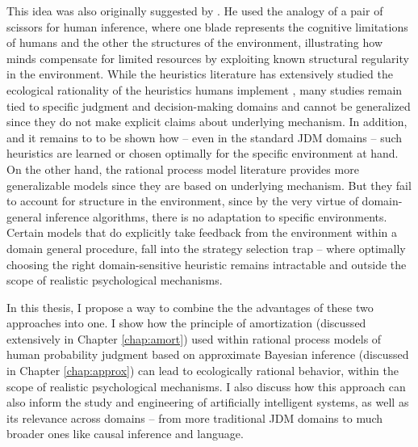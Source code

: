 This idea was also originally suggested by \citet{simon1955behavioral}. He used the analogy of a pair of scissors for human inference, where one blade represents the cognitive limitations of humans and the other the structures of the environment, illustrating how minds compensate for limited resources by exploiting known structural regularity in the environment. While the heuristics literature has extensively studied the ecological rationality of the heuristics humans implement \citep{gigerenzer2008heuristics}, many studies remain tied to specific judgment and decision-making domains and cannot be generalized since they do not make explicit claims about underlying mechanism. In addition, and it remains to to be shown how -- even in the standard JDM domains -- such heuristics are learned or chosen optimally for the specific environment at hand. On the other hand, the rational process model literature provides more generalizable models since they are based on underlying mechanism. But they fail to account for structure in the environment, since by the very virtue of domain-general inference algorithms, there is no adaptation to specific environments. Certain models that do explicitly take feedback from the environment within a domain general procedure, fall into the strategy selection trap -- where optimally choosing the right domain-sensitive heuristic remains intractable and outside the scope of realistic psychological mechanisms.

In this thesis, I propose a way to combine the the advantages of these two approaches into one. I show how the principle of amortization (discussed extensively in Chapter \ref{chap:amort}) used within rational process models of human probability judgment based on approximate Bayesian inference (discussed in Chapter \ref{chap:approx}) can lead to ecologically rational behavior, within the scope of realistic psychological mechanisms. I also discuss how this approach can also inform the study and engineering of artificially intelligent systems, as well as its relevance across domains -- from more traditional JDM domains to much broader ones like causal inference and language.

